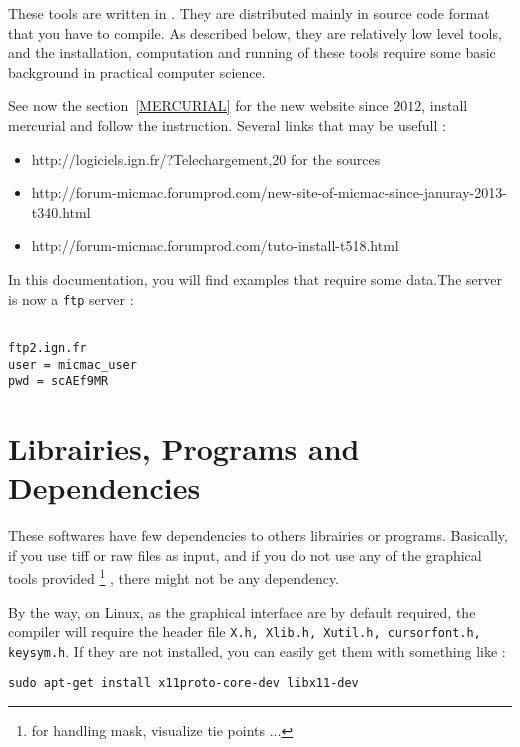 \label{Install}
These tools are written in \CPP. They are distributed mainly in source code
format that you have to compile. As described below, they are relatively
low level tools, and the installation, computation and running of these
tools require some basic background in practical computer science.

See now the section~\ref{MERCURIAL} for the new website since $2012$, install mercurial and follow the instruction. 
Several links that may be usefull :

\begin{itemize}
   \item http://logiciels.ign.fr/?Telechargement,20   for the sources
   \item http://forum-micmac.forumprod.com/new-site-of-micmac-since-januray-2013-t340.html   
   \item http://forum-micmac.forumprod.com/tuto-install-t518.html
\end{itemize}


In this documentation, you will find examples that require some
data.The server is now a {\tt ftp} server :

\begin{verbatim}

ftp2.ign.fr
user = micmac_user
pwd = scAEf9MR

\end{verbatim}





\section{Librairies, Programs and Dependencies}

These softwares have few dependencies to others librairies or programs. Basically,
if you use tiff or raw files as input, and if you do not use any of the graphical
tools provided \footnote{for handling mask, visualize tie points ...} ,
there might not be any dependency. 

By the way, on Linux, as the graphical interface are by default required, the compiler
will require the header file {\tt X.h, Xlib.h, Xutil.h, cursorfont.h, keysym.h}.
If they are not installed, you can easily get them  with something like :


\begin{verbatim}
sudo apt-get install x11proto-core-dev libx11-dev
\end{verbatim}

